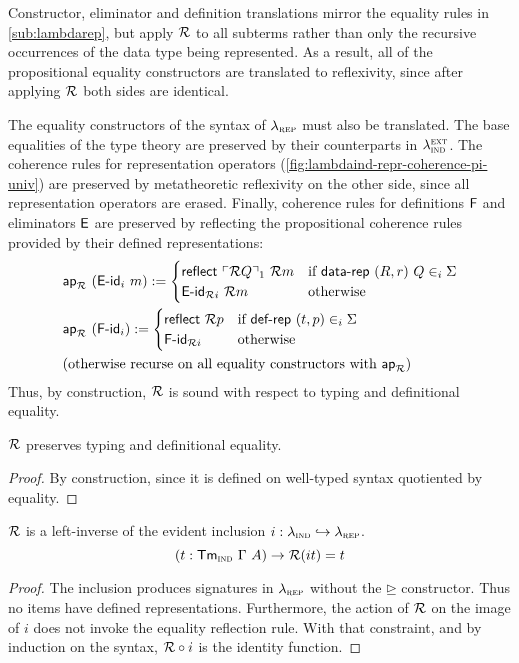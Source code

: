 Constructor, eliminator and definition translations mirror the equality rules in
\cref{sub:lambdarep}, but apply $\mathcal{R}$ to all subterms rather than only the
recursive occurrences of the data type being represented. As a result, all of
the propositional equality constructors are translated to reflexivity, since
after applying $\mathcal{R}$ both sides are identical.

The equality constructors of the syntax of $\lambda_{\textsc{rep}}$ must also be translated.
The base equalities of the type theory are preserved by their counterparts in $\lambda_{\textsc{ind}}^\textsc{ext}$.
The coherence rules for representation operators
(\cref{fig:lambdaind-repr-coherence-pi-univ}) are preserved by metatheoretic
reflexivity on the other side, since all representation operators are erased.
Finally, coherence rules for definitions $\textsf{F}$ and eliminators $\textsf{E}$ are
preserved by reflecting the propositional coherence rules provided by their
defined representations:
\begin{align*}
& \mta{ap}_\R\ (\mta{E-id}_i\ m) :=
\begin{cases}
    \mta{reflect}\ \emb{\R Q}_1\ \R m & \text{if}\ \mta{data-rep}\ (R, r)\ Q \in_i \Sigma \\
    \mta{E-id}_{\R i}\ \R m & \text{otherwise}
    \end{cases} \\
    & \mta{ap}_\R\ (\mta{F-id}_i) :=
    \begin{cases}
        \mta{reflect}\ \R p & \text{if}\ \mta{def-rep}\ (t, p) \in_i \Sigma \\
        \mta{F-id}_{\R i} & \text{otherwise}
        \end{cases} \\
& \text{(otherwise recurse on all equality constructors with $\mta{ap}_\R$)}
\end{align*}
Thus, by construction, $\mathcal{R}$ is sound with respect to typing and definitional equality.

\begin{theorem}
    $\mathcal{R}$ preserves typing and definitional equality.
    \begin{proof}
        By construction, since it is defined on well-typed syntax quotiented by equality.
    \end{proof}
\end{theorem}

\begin{theorem}
    $\mathcal{R}$ is a left-inverse of the evident inclusion $i : \lambda_{\textsc{ind}} \hookrightarrow \lambda_{\textsc{rep}}$.
    \[
        (t : \textsf{Tm}_{{\textsc{ind}}}\ \Gamma\ A) \to \mathcal{R}(i t) = t
    \]
    \begin{proof}
        The inclusion produces signatures in $\lambda_{\textsc{rep}}$ without the $\unrhd$ constructor. Thus no
        items have defined representations. Furthermore, the action of $\mathcal{R}$ on
        the image of $i$ does not invoke the equality reflection rule. With that
        constraint, and by induction on the syntax, $\mathcal{R} \circ i$ is the identity
        function.
    \end{proof}
\end{theorem}

